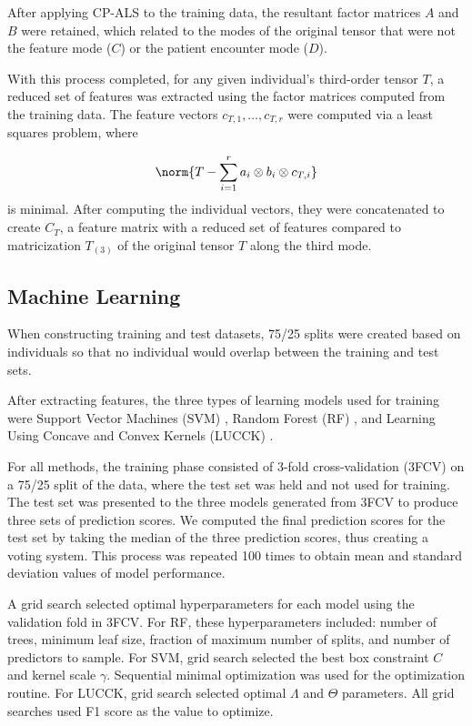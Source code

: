 After applying CP-ALS to the training data, the resultant factor matrices $A$ and $B$ were retained, which related to the modes of the original tensor that were not the feature mode ($C$) or the patient encounter mode ($D$). 

With this process completed, for any given individual's third-order tensor $T$, a reduced set of features was extracted using the factor matrices computed from the training data. The feature vectors $c_{T,1}, \dots, c_{T,r}$ were computed via a least squares problem, where

\begin{equation*}
    \norm{T - \sum^{r}_{i=1} a_i \otimes b_i \otimes c_{T,i}}
\end{equation*}
is minimal. After computing the individual vectors, they were concatenated to create $C_T$, a feature matrix with a reduced set of features compared to matricization $T_{(3)}$ of the original tensor $T$ along the third mode.

\subsection*{Machine Learning} \label{sec:methods_ml}
When constructing training and test datasets, 75/25 splits were created based on individuals so that no individual would overlap between the training and test sets.

After extracting features, the three types of learning models used for training were Support Vector Machines (SVM) \cite{cortes_support-vector_1995}, Random Forest (RF) \cite{breiman_random_2001}, and Learning Using Concave and Convex Kernels (LUCCK) \cite{sabeti_learning_2019}.

For all methods, the training phase consisted of 3-fold cross-validation (3FCV) on a 75/25 split of the data, where the test set was held and not used for training. The test set was presented to the three models generated from 3FCV to produce three sets of prediction scores. We computed the final prediction scores for the test set by taking the median of the three prediction scores, thus creating a voting system. This process was repeated 100 times to obtain mean and standard deviation values of model performance. 

A grid search selected optimal hyperparameters for each model using the validation fold in 3FCV. For RF, these hyperparameters included: number of trees, minimum leaf size, fraction of maximum number of splits, and number of predictors to sample. For SVM, grid search selected the best box constraint $C$ and kernel scale $\gamma$. Sequential minimal optimization \cite{JMLR:v6:fan05a} was used for the optimization routine. For LUCCK, grid search selected optimal $\Lambda$ and $\Theta$ parameters. All grid searches used F1 score as the value to optimize. 

